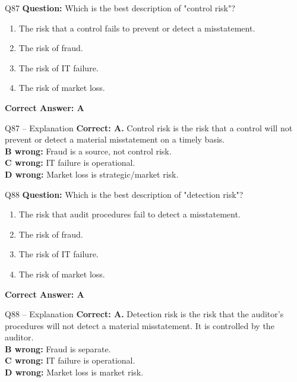 \documentclass[aspectratio=169,10pt]{beamer}
\begin{document}
	\begin{frame}[t]{Q87}
		\small
		\textbf{Question:} Which is the best description of "control risk"?
		\begin{enumerate}[label=\Alph*.,itemsep=1pt,topsep=2pt]
			\item The risk that a control fails to prevent or detect a misstatement.
			\item The risk of fraud.
			\item The risk of IT failure.
			\item The risk of market loss.
		\end{enumerate}
		\vspace{4pt}
		\textbf{Correct Answer: A}
	\end{frame}
	
	\begin{frame}[t]{Q87 -- Explanation}
		\small
		\textbf{Correct: A.} Control risk is the risk that a control will not prevent or detect a material misstatement on a timely basis. \\[4pt]
		\textbf{B wrong:} Fraud is a source, not control risk. \\[2pt]
		\textbf{C wrong:} IT failure is operational. \\[2pt]
		\textbf{D wrong:} Market loss is strategic/market risk.
	\end{frame}
	
	\begin{frame}[t]{Q88}
		\small
		\textbf{Question:} Which is the best description of "detection risk"?
		\begin{enumerate}[label=\Alph*.,itemsep=1pt,topsep=2pt]
			\item The risk that audit procedures fail to detect a misstatement.
			\item The risk of fraud.
			\item The risk of IT failure.
			\item The risk of market loss.
		\end{enumerate}
		\vspace{4pt}
		\textbf{Correct Answer: A}
	\end{frame}
	
	\begin{frame}[t]{Q88 -- Explanation}
		\small
		\textbf{Correct: A.} Detection risk is the risk that the auditor's procedures will not detect a material misstatement. It is controlled by the auditor. \\[4pt]
		\textbf{B wrong:} Fraud is separate. \\[2pt]
		\textbf{C wrong:} IT failure is operational. \\[2pt]
		\textbf{D wrong:} Market loss is market risk.
	\end{frame}
	
\end{document}
